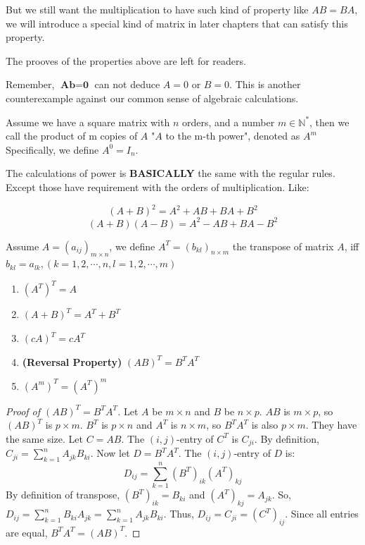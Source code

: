 \documentclass[oneside]{book}
\begin{document}
But we still want the multiplication to have such kind of property like $AB = BA$, we will introduce a special kind of matrix in later chapters that can satisfy this property.

The prooves of the properties above are left for readers.

\begin{remark}
Remember, $\textbf{A} \textbf{b} = \textbf{0}$ can not deduce $A=0$ or $B=0$. This is another counterexample against our common sense of algebraic calculations.
\end{remark}

\begin{definition}
Assume we have a square matrix with $n$ orders, and a number $m \in \mathbb{N}^{*}$, then we call the product of m copies of $A$ "$A$ to the m-th power", denoted as $A^m$
Specifically, we define $A^0 = I_n$.
\end{definition}

The calculations of power is \textbf{BASICALLY} the same with the regular rules. Except those have requirement with the orders of multiplication. Like:

\[(A+B)^2 = A^2 + AB + BA + B^2\]
\[(A+B)(A-B) = A^2 - AB + BA - B^2\]

\begin{definition}
Assume $A=(a_{ij})_{m \times n}$, we define $A^T=(b_{kl})_{n \times m}$ the transpose of matrix $A$, iff $b_{kl} = a_{lk}, (k=1,2,\cdots,n,l=1,2,\cdots,m)$
\end{definition}

\begin{property}
\begin{enumerate}
    \item $(A^T)^T = A$
    \item $(A+B)^T = A^T + B^T$
    \item $(cA)^T = cA^T$
    \item \textbf{(Reversal Property)} $(AB)^T = B^T A^T$
    \item $(A^m)^T = (A^T)^m$
\end{enumerate}
\end{property}
\begin{proof}[Proof of $(AB)^T = B^T A^T$]
Let $A$ be $m \times n$ and $B$ be $n \times p$. $AB$ is $m \times p$, so $(AB)^T$ is $p \times m$.
$B^T$ is $p \times n$ and $A^T$ is $n \times m$, so $B^T A^T$ is also $p \times m$. They have the same size.
Let $C = AB$. The $(i, j)$-entry of $C^T$ is $C_{ji}$.
By definition, $C_{ji} = \sum_{k=1}^n A_{jk} B_{ki}$.
Now let $D = B^T A^T$. The $(i, j)$-entry of $D$ is:
\[ D_{ij} = \sum_{k=1}^n (B^T)_{ik} (A^T)_{kj} \]
By definition of transpose, $(B^T)_{ik} = B_{ki}$ and $(A^T)_{kj} = A_{jk}$.
So, $D_{ij} = \sum_{k=1}^n B_{ki} A_{jk} = \sum_{k=1}^n A_{jk} B_{ki}$.
Thus, $D_{ij} = C_{ji} = (C^T)_{ij}$. Since all entries are equal, $B^T A^T = (AB)^T$.
\end{proof}
\end{document}

